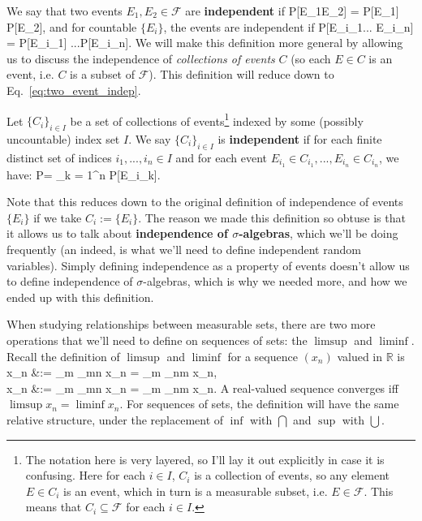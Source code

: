 We say that two events $E_1, E_2\in\mathcal F$ are \textbf{independent} if
\eq
	\mathbb P[E_1\cap E_2] = \mathbb P[E_1]\,\mathbb P[E_2],
	\label{eq:two_event_indep}
\qe
and for countable $\{E_i\}$, the events are independent if 
\eq
	\mathbb P[E_{i_1}\cap ... \cap E_{i_n}] = \mathbb P[E_{i_1}] \times ...\times \mathbb P[E_{i_n}]. 
\qe
We will make this definition more general by allowing us to discuss the independence of \textit{collections of events} $C$ (so each $E\in C$ is an event, i.e. $C$ is a subset of $\mathcal F$). This definition will reduce down to Eq.~\eqref{eq:two_event_indep}. 
\begin{definition}
	Let $\{C_i\}_{i\in I}$ be a set of collections of events\footnote{The notation here is very layered, so I'll lay it out explicitly in case it is confusing. Here for each $i\in I$, $C_i$ is a collection of events, so any element $E\in C_i$ is an event, which in turn is a measurable subset, i.e. $E\in\mathcal F$. This means that $C_i\subseteq\mathcal F$ for each $i\in I$.} indexed by some (possibly uncountable) index set $I$. We say $\{C_i\}_{i\in I}$ is \textbf{independent} if for each finite distinct set of indices $i_1, ..., i_n\in I$ and for each event $E_{i_1}\in C_{i_1}, ..., E_{i_n}\in C_{i_n}$, we have:
	\eq
		\mathbb P = \prod_{k = 1}^n \mathbb P[E_{i_k}].
	\qe
\end{definition}
Note that this reduces down to the original definition of independence of events $\{E_i\}$ if we take $C_i := \{E_i\}$. The reason we made this definition so obtuse is that it allows us to talk about \textbf{independence of $\sigma$-algebras}, which we'll be doing frequently (an indeed, is what we'll need to define independent random variables). Simply defining independence as a property of events doesn't allow us to define independence of $\sigma$-algebras, which is why we needed more, and how we ended up with this definition. 

When studying relationships between measurable sets, there are two more operations that we'll need to define on sequences of sets: the $\limsup$ and $\liminf$. Recall the definition of $\limsup$ and $\liminf$ for a sequence $(x_n)$ valued in $\mathbb R$ is
\eq
	\limsup x_n &:= \inf_m \sup_{m\geq n} x_n = \lim_{m\uparrow\infty} \sup_{n\geq m} x_n\in [-\infty, \infty], \\
	\liminf x_n &:= \sup_m \inf_{m\geq n} x_n = \lim_{m\uparrow\infty} \inf_{n\geq m} x_n\in [-\infty, \infty].
\qe
A real-valued sequence converges iff $\limsup x_n = \liminf x_n$. For sequences of sets, the definition will have the same relative structure, under the replacement of $\inf$ with $\bigcap$ and $\sup$ with $\bigcup$.

